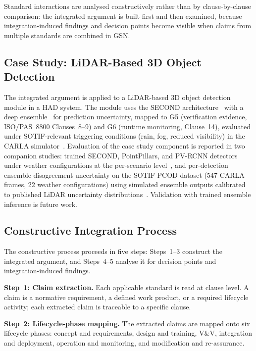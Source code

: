 \documentclass[runningheads]{llncs}
\newcommand{\crev}[1]{\textcolor{blue!75!black}{#1}}
\newcommand{\crev}[1]{#1}
\begin{document}
	Standard interactions are analysed constructively rather than by clause-by-clause comparison: the integrated argument is built first and then examined, because integration-induced findings and decision points become visible when claims from multiple standards are combined in GSN.
	
	\subsection{Case Study: LiDAR-Based 3D Object Detection}
	\label{sec:casestudy}
	
	The integrated argument is applied to a LiDAR-based 3D object detection module in a HAD system. The module uses the SECOND architecture~\cite{Yan2018} with a deep ensemble~\cite{Lakshminarayanan2017} for prediction uncertainty, mapped to G5 (verification evidence, ISO/PAS~8800 Clauses~8--9) and G6 (runtime monitoring, Clause~14), evaluated under SOTIF-relevant triggering conditions (rain, fog, reduced visibility) in the CARLA simulator~\cite{CARLA}. \crev{Evaluation of the case study component is reported in two companion studies: trained SECOND, PointPillars, and PV-RCNN detectors under weather configurations at the per-scenario level~\cite{PatelJungVEHITS2024}, and per-detection ensemble-disagreement uncertainty on the SOTIF-PCOD dataset (547 CARLA frames, 22 weather configurations) using simulated ensemble outputs calibrated to published LiDAR uncertainty distributions~\cite{PatelJungVEHITS2026}. Validation with trained ensemble inference is future work.}
	
	\subsection{Constructive Integration Process}
	\label{sec:process}
	
	The constructive process proceeds in five steps: Steps~1--3 construct the integrated argument, and Steps~4--5 analyse it for decision points and integration-induced findings.
	
	\textbf{Step~1: Claim extraction.} Each applicable standard is read at clause level. A claim is a normative requirement, a defined work product, or a required lifecycle activity; each extracted claim is traceable to a specific clause.
	
	\textbf{Step~2: Lifecycle-phase mapping.} The extracted claims are mapped onto six lifecycle phases: concept and requirements, design and training, V\&V, integration and deployment, operation and monitoring, and modification and re-assurance.
	
\end{document}
